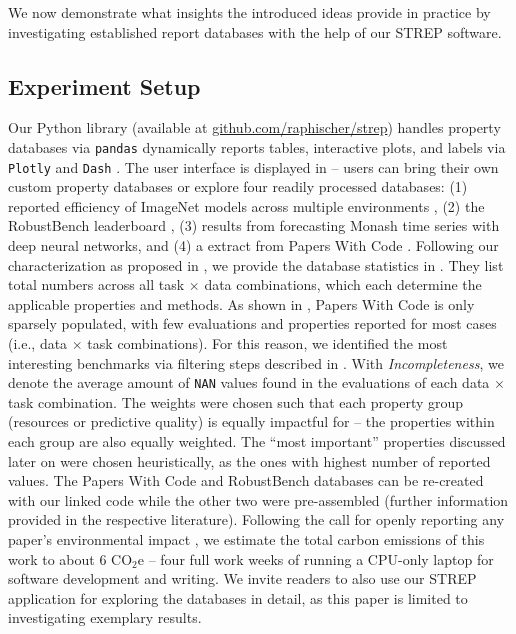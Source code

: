 \documentclass[sn-mathphys,Numbered]{sn-jnl}%
\theoremstyle{thmstylethree}%
\begin{document}
We now demonstrate what insights the introduced ideas provide in practice by investigating established report databases with the help of our STREP software. 

\subsection{Experiment Setup}
Our Python library (available at \url{github.com/raphischer/strep}) handles property databases via \texttt{pandas} \cite{jeff_reback_2022_6053272} dynamically reports tables, interactive plots, and labels via \texttt{Plotly} and \texttt{Dash} \cite{dabbas_interactive_2021}.
The user interface is displayed in  -- users can bring their own custom property databases or explore four readily processed databases:
(1) reported efficiency of ImageNet models across multiple environments \cite{Assessing_Energy_Efficiency_of_ML}, (2) the RobustBench leaderboard \cite{croce2020robustbench}, (3) results from forecasting Monash time series \cite{godahewa2021monash} with deep neural networks, and (4) a extract from Papers With Code \cite{paperswithcode}.
Following our characterization as proposed in , we provide the database statistics in .
They list total numbers across all task $\times$ data combinations, which each determine the applicable properties and methods.
As shown in , Papers With Code is only sparsely populated, with few evaluations and properties reported for most cases (i.e., data $\times$ task combinations).
For this reason, we identified the most interesting benchmarks via filtering steps described in .
With \emph{Incompleteness}, we denote the average amount of \texttt{NAN} values found in the evaluations of each data $\times$ task combination.
The weights were chosen such that each property group (resources or predictive quality) is equally impactful for  -- the properties within each group are also equally weighted.
The ``most important'' properties discussed later on were chosen heuristically, as the ones with highest number of reported values.
The Papers With Code and RobustBench databases can be re-created with our linked code while the other two were pre-assembled (further information provided in the respective literature).
Following the call for openly reporting any paper's environmental impact \cite{Schwartz/etal/2020b}, we estimate the total carbon emissions of this work to about 6 CO$_2$e -- four full work weeks of running a CPU-only laptop \cite{lacoste_quantifying_2019} for software development and writing.
We invite readers to also use our STREP application for exploring the databases in detail, as this paper is limited to investigating exemplary results.
\end{document}
